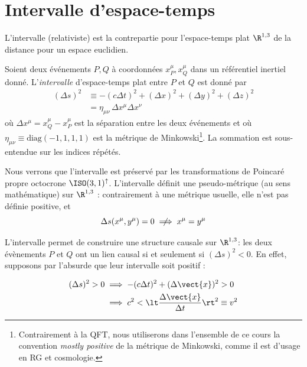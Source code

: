 {\section{Intervalle d'espace-temps}

L'intervalle (relativiste) est la contrepartie pour l'espace-temps plat $\R^{1,3}$ de la distance pour un espace euclidien.

\begin{theoremframe}
    \begin{defi}
        Soient deux événements $P,Q$ à coordonnées $x_P^\mu, x_Q^\mu$ dans un référentiel inertiel donné. L'\emph{intervalle} d'espace-temps plat entre $P$ et $Q$ est donné par
        \begin{align}
            (\Delta s)^2 &\equiv -(c\Delta t)^2 + (\Delta x)^2 + (\Delta y)^2 + (\Delta z)^2\\
            &= \eta _{\mu \nu} \, \Delta x^{\mu} \Delta x^{\nu}
        \end{align}
        où $\Delta x^{\mu}=x^\mu_Q-x^\mu_P$ est la séparation entre les deux événements et où $\eta _{\mu \nu} \equiv \textrm{diag}(-1, 1, 1, 1)$ est la métrique de Minkowski\footnote{Contrairement à la QFT, nous utiliserons dans l'ensemble de ce cours la convention \emph{mostly positive} de la métrique de Minkowski, comme il est d'usage en RG et cosmologie.}. La sommation est sous-entendue sur les indices répétés.
    \end{defi}
\end{theoremframe}
Nous verrons que l'intervalle est préservé par les transformations de Poincaré propre octocrone $\ISO (3,1)^\uparrow$. L'intervalle définit une pseudo-métrique (au sens mathématique) sur $\R^{1,3}$ : contrairement à une métrique usuelle, elle n'est pas définie positive, et 
\begin{equation}
    \Delta s(x^\mu,y^\mu)=0 \centernot \implies x^\mu=y^\mu
\end{equation}

L'intervalle permet de construire une structure causale sur $\R^{1,3}$: les deux évènements $P$ et $Q$ ont un lien causal si et seulement si $(\Delta s)^2 < 0$. En effet, supposons par l'absurde que leur intervalle soit positif :

\begin{align}
    (\Delta s)^2 > 0 &\implies -(c\Delta t)^2 + (\Delta \vect{x})^2 > 0\\
    &\implies c^2 < \lt \frac{\Delta \vect{x}}{\Delta t} \rt^2 \equiv v^2\\
\end{align}

}
